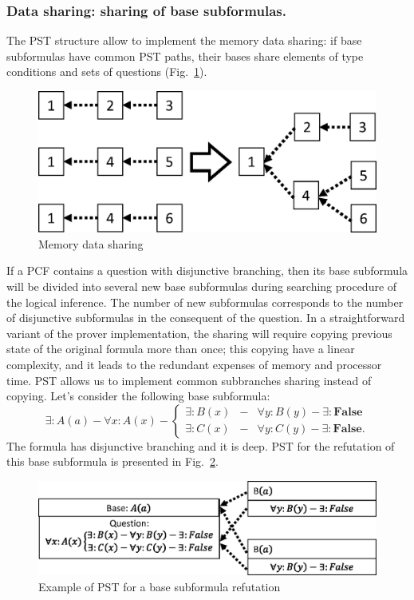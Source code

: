 \documentclass[runningheads,a4paper]{llncs}
\begin{document}
\subsubsection{Data sharing: sharing of base subformulas.}
The PST structure allow to implement the memory data sharing: if base subformulas have common PST paths, their bases share elements of type conditions and sets of questions (Fig.~\ref{fig:datasharing1}).
\begin{figure}[h]
  \vspace{0.5cm}
  \centering
  \includegraphics[width=0.4\linewidth]{img/Graphsp1.eps}
  \caption{Memory data sharing}
  \label{fig:datasharing1}
\end{figure}

If a PCF contains a question with disjunctive branching, then its base subformula will be divided into several new base subformulas during searching procedure of the logical inference. The number of new subformulas corresponds to the number of disjunctive subformulas in the consequent of the question. In a straightforward variant of the prover implementation, the sharing will require copying previous state of the original formula more than once; this copying have a linear complexity, and it leads to the redundant expenses of memory and processor time. PST allows us to implement common subbranches sharing instead of copying. Let's consider the following base subformula:
$$\exists: A(a) - \forall x: A(x) - \left\{
\begin{array}{lcl}
 \exists \colon B(x) & - & \forall y: B(y) - \exists\colon\boldsymbol{False}\\
 \exists \colon C(x) & - & \forall y: C(y) - \exists\colon\boldsymbol{False}.
\end{array}
\right. $$
The formula has disjunctive branching and it is deep. PST for the refutation of this base subformula is presented in Fig.~\ref{fig:datasharing2}.
\begin{figure}[h]
  \vspace{0.5cm}
  \centering
  \includegraphics[width=0.82\linewidth]{img/DataSharing2p1.eps}
  \caption{Example of PST for a base subformula refutation}
  \label{fig:datasharing2}
\end{figure}
\end{document}
